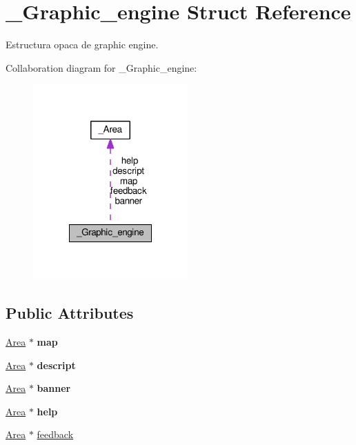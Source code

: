 \hypertarget{struct__Graphic__engine}{\section{\+\_\+\+Graphic\+\_\+engine Struct Reference}
\label{struct__Graphic__engine}
}


Estructura opaca de graphic engine.  




Collaboration diagram for \+\_\+\+Graphic\+\_\+engine\+:
\nopagebreak
\begin{figure}[H]
\begin{center}
\leavevmode
\includegraphics[width=168pt]{struct__Graphic__engine__coll__graph}
\end{center}
\end{figure}
\subsection*{Public Attributes}
\begin{DoxyCompactItemize}
\item 
\hypertarget{struct__Graphic__engine_a1ea06bb881d335da8c31d63b3e834bdb}{\hyperlink{struct__Area}{Area} $\ast$ {\bfseries map}}\label{struct__Graphic__engine_a1ea06bb881d335da8c31d63b3e834bdb}

\item 
\hypertarget{struct__Graphic__engine_a8a4927aedd398b43f86c871f197edf1d}{\hyperlink{struct__Area}{Area} $\ast$ {\bfseries descript}}\label{struct__Graphic__engine_a8a4927aedd398b43f86c871f197edf1d}

\item 
\hypertarget{struct__Graphic__engine_a37d117af941b6aa825bb3dff24fe9e27}{\hyperlink{struct__Area}{Area} $\ast$ {\bfseries banner}}\label{struct__Graphic__engine_a37d117af941b6aa825bb3dff24fe9e27}

\item 
\hypertarget{struct__Graphic__engine_a96833ee68d6330b61014979614f7fb77}{\hyperlink{struct__Area}{Area} $\ast$ {\bfseries help}}\label{struct__Graphic__engine_a96833ee68d6330b61014979614f7fb77}

\item 
\hyperlink{struct__Area}{Area} $\ast$ \hyperlink{struct__Graphic__engine_aaae226ce3b87e512ec196f792ed2f552}{feedback}
\end{DoxyCompactItemize}


